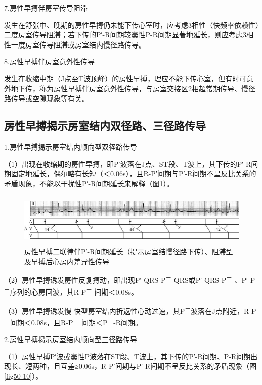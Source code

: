 7.房性早搏伴房室传导阻滞

发生在舒张中、晚期的房性早搏仍未能下传心室时，应考虑3相性（快频率依赖性）二度房室传导阻滞；若下传的P′-R间期较窦性P-R间期显著地延长，则应考虑3相性一度房室传导阻滞或房室结内慢径路传导。

8.房性早搏伴房室意外性传导

发生在收缩中期（J点至T波顶峰）的房性早搏，理应不能下传心室，但有时可意外地下传，称为房性早搏伴房室意外性传导，与房室交接区2相超常期传导、慢径路传导或空隙现象等有关。

\protect\hypertarget{text00018.htmlux5cux23subid139}{}{}

\subsection{房性早搏揭示房室结内双径路、三径路传导}

1.房性早搏揭示房室结内顺向型双径路传导

（1）出现在收缩期的房性早搏，即P′波落在J点、ST段、T波上，其下传的P′-R间期固定地延长，偶尔略有长短（＜0.06s），且R-P′间期与P′-R间期不呈反比关系的矛盾现象，不能以干扰性P′-R间期延长来解释（图\ref{fig11-11}）。

\begin{figure}[!htbp]
 \centering
 \includegraphics[width=5.73958in,height=1in]{./images/Image00163.jpg}
 \captionsetup{justification=centering}
 \caption{房性早搏二联律伴P′-R间期延长（提示房室结慢径路下传）、阻滞型及早搏后心房内差异性传导}
 \label{fig11-11}
  \end{figure} 

（2）房性早搏诱发房性反复搏动，即出现P′-QRS-P\textsuperscript{－}-QRS或P′-QRS-P\textsuperscript{－} 、P′-P\textsuperscript{－}序列的心房回波，其R-P\textsuperscript{－} 间期＜0.08s。

（3）房性早搏诱发慢-快型房室结内折返性心动过速，其P\textsuperscript{－}波落在J点附近，R-P\textsuperscript{－}间期＜0.08s，且R-P\textsuperscript{－} 间期＜P\textsuperscript{－}-R间期。

2.房性早搏揭示房室结内顺向型三径路传导

（1）房性早搏P′波或窦性P波落在ST段、T波上，其下传的P′-R间期、P-R间期出现长、短两种，且互差≥0.06s，R-P′间期与P′-R间期不呈反比关系的矛盾现象（图\ref{fig50-10}）。

